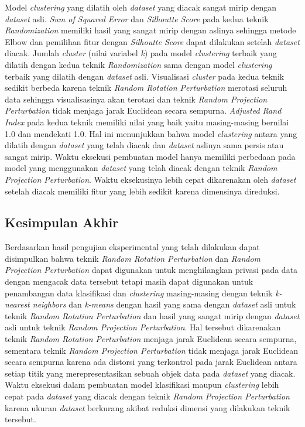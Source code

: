 Model \textit{clustering} yang dilatih oleh \textit{dataset} yang diacak sangat mirip dengan \textit{dataset} asli. \textit{Sum of Squared Error} dan \textit{Silhoutte Score} pada kedua teknik \textit{Randomization} memiliki hasil yang sangat mirip dengan aslinya sehingga metode Elbow dan pemilihan fitur dengan \textit{Silhoutte Score} dapat dilakukan setelah \textit{dataset} diacak. Jumlah \textit{cluster} (nilai variabel \textit{k}) pada model \textit{clustering} terbaik yang dilatih dengan kedua teknik \textit{Randomization} sama dengan model \textit{clustering} terbaik yang dilatih dengan \textit{dataset} asli. Visualisasi \textit{cluster} pada kedua teknik sedikit berbeda karena teknik \textit{Random Rotation Perturbation} merotasi seluruh data sehingga visualisasinya akan terotasi dan teknik \textit{Random Projection Perturbation} tidak menjaga jarak Euclidean secara sempurna. \textit{Adjusted Rand Index} pada kedua teknik memiliki nilai yang baik yaitu masing-masing bernilai 1.0 dan mendekati 1.0. Hal ini menunjukkan bahwa model \textit{clustering} antara yang dilatih dengan \textit{dataset} yang telah diacak dan \textit{dataset} aslinya sama persis atau sangat mirip. Waktu eksekusi pembuatan model hanya memiliki perbedaan pada model yang menggunakan \textit{dataset} yang telah diacak dengan teknik \textit{Random Projection Perturbation}. Waktu eksekusinya lebih cepat dikarenakan oleh \textit{dataset} setelah diacak memiliki fitur yang lebih sedikit karena dimensinya direduksi.

\subsection{Kesimpulan Akhir}
\label{subsec:kesimpulan-eksperimental}

Berdasarkan hasil pengujian eksperimental yang telah dilakukan dapat disimpulkan bahwa teknik \textit{Random Rotation Perturbation} dan \textit{Random Projection Perturbation} dapat digunakan untuk menghilangkan privasi pada data dengan mengacak data tersebut tetapi masih dapat digunakan untuk penambangan data klasifikasi dan \textit{clustering} masing-masing dengan teknik \textit{k-nearest neighbors} dan \textit{k-means} dengan hasil yang sama dengan \textit{dataset} asli untuk teknik \textit{Random Rotation Perturbation} dan hasil yang sangat mirip dengan \textit{dataset} asli untuk teknik \textit{Random Projection Perturbation}. Hal tersebut dikarenakan teknik \textit{Random Rotation Perturbation} menjaga jarak Euclidean secara sempurna, sementara teknik \textit{Random Projection Perturbation} tidak menjaga jarak Euclidean secara sempurna karena ada distorsi yang terkontrol pada jarak Euclidean antara setiap titik yang merepresentasikan sebuah objek data pada \textit{dataset} yang diacak. Waktu eksekusi dalam pembuatan model klasifikasi maupun \textit{clustering} lebih cepat pada \textit{dataset} yang diacak dengan teknik \textit{Random Projection Perturbation} karena ukuran \textit{dataset} berkurang akibat reduksi dimensi yang dilakukan teknik tersebut.

